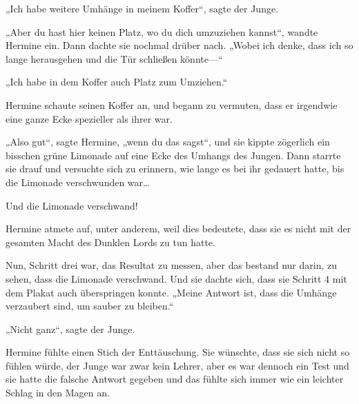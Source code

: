 „Ich habe weitere Umhänge in meinem Koffer“, sagte der Junge.

„Aber du hast hier keinen Platz, wo du dich umzuziehen kannst“, wandte Hermine ein. Dann dachte sie nochmal drüber nach. „Wobei ich denke, dass ich so lange herausgehen und die Tür schließen könnte—“

„Ich habe in dem Koffer auch Platz zum Umziehen.“

Hermine schaute seinen Koffer an, und begann zu vermuten, dass er irgendwie eine ganze Ecke spezieller als ihrer war.

„Also gut“, sagte Hermine, „wenn du das sagst“, und sie kippte zögerlich ein bisschen grüne Limonade auf eine Ecke des Umhangs des Jungen. Dann starrte sie drauf und versuchte sich zu erinnern, wie lange es bei ihr gedauert hatte, bis die Limonade verschwunden war…

Und die Limonade verschwand!

Hermine atmete auf, unter anderem, weil dies bedeutete, dass sie es nicht mit der gesamten Macht des Dunklen Lords zu tun hatte.

Nun, Schritt drei war, das Resultat zu messen, aber das bestand nur darin, zu sehen, dass die Limonade verschwand. Und sie dachte sich, dass sie Schritt 4 mit dem Plakat auch überspringen konnte. „Meine Antwort ist, dass die Umhänge verzaubert sind, um sauber zu bleiben.“

„Nicht ganz“, sagte der Junge.

Hermine fühlte einen Stich der Enttäuschung. Sie wünschte, dass sie sich nicht so fühlen würde, der Junge war zwar kein Lehrer, aber es war dennoch ein Test und sie hatte die falsche Antwort gegeben und das fühlte sich immer wie ein leichter Schlag in den Magen an.

